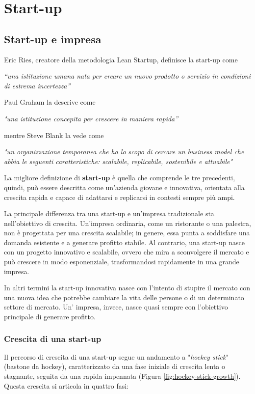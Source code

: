 \part{Start-up}
\chapter{Start-up e impresa}
Eric Ries, creatore della metodologia Lean Startup, definisce la start-up come
\begin{center}
\textit{“una istituzione umana nata per creare un nuovo prodotto o servizio in condizioni di estrema incertezza”}    
\end{center}
Paul Graham la descrive come
\begin{center}
\textit{"una istituzione concepita per crescere in maniera rapida”}
\end{center}
mentre Steve Blank la vede come 
\begin{center}
\textit{"un organizzazione temporanea che ha lo scopo di cercare un business model che abbia le seguenti caratteristiche: scalabile, replicabile, sostenibile e attuabile"}
\end{center}
\begin{redbar}
La migliore definizione di \textbf{start-up} è quella che comprende le tre precedenti, quindi, può essere descritta come un’azienda giovane e innovativa, orientata alla crescita rapida e capace di adattarsi e replicarsi in contesti sempre più ampi.
\end{redbar}
La principale differenza tra una start-up e un’impresa tradizionale sta nell'obiettivo di crescita. Un’impresa ordinaria, come un ristorante o una palestra, non è progettata per una crescita scalabile; in genere, essa punta a soddisfare una domanda esistente e a generare profitto stabile. Al contrario, una start-up nasce con un progetto innovativo e scalabile, ovvero che mira a sconvolgere il mercato e può crescere in modo esponenziale, trasformandosi rapidamente in una grande impresa.

In altri termini la start-up innovativa nasce con l’intento di stupire il mercato con una nuova idea che potrebbe cambiare la vita delle persone o di un determinato settore di mercato. Un’ impresa, invece, nasce quasi sempre con l’obiettivo principale di generare profitto.

\section{Crescita di una start-up}
Il percorso di crescita di una start-up segue un andamento a "\textit{hockey stick}" (bastone da hockey), caratterizzato da una fase iniziale di crescita lenta o stagnante, seguita da una rapida impennata (Figura \ref{fig:hockey-stick-growth}). Questa crescita si articola in quattro fasi:

